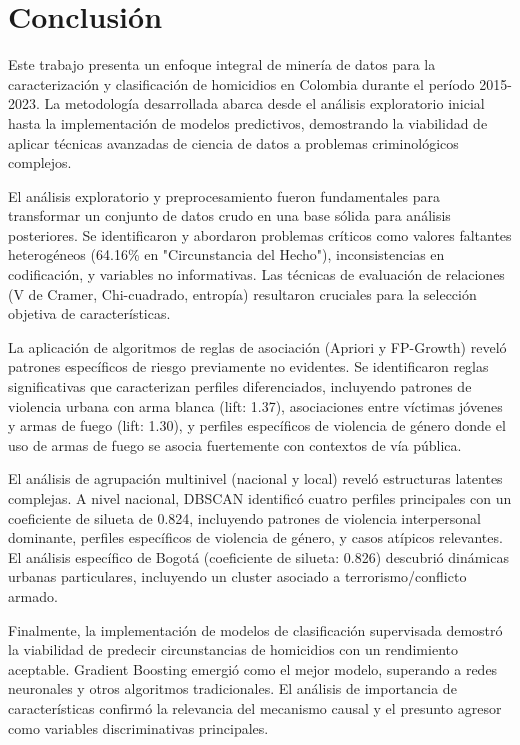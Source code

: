 \documentclass[lettersize,journal]{IEEEtran}
\begin{document}
\section{Conclusión}

Este trabajo presenta un enfoque integral de minería de datos para la caracterización y clasificación de homicidios en Colombia durante el período 2015-2023. La metodología desarrollada abarca desde el análisis exploratorio inicial hasta la implementación de modelos predictivos, demostrando la viabilidad de aplicar técnicas avanzadas de ciencia de datos a problemas criminológicos complejos.

El análisis exploratorio y preprocesamiento fueron fundamentales para transformar un conjunto de datos crudo en una base sólida para análisis posteriores. Se identificaron y abordaron problemas críticos como valores faltantes heterogéneos (64.16\% en "Circunstancia del Hecho"), inconsistencias en codificación, y variables no informativas. Las técnicas de evaluación de relaciones (V de Cramer, Chi-cuadrado, entropía) resultaron cruciales para la selección objetiva de características.

La aplicación de algoritmos de reglas de asociación (Apriori y FP-Growth) reveló patrones específicos de riesgo previamente no evidentes. Se identificaron reglas significativas que caracterizan perfiles diferenciados, incluyendo patrones de violencia urbana con arma blanca (lift: 1.37), asociaciones entre víctimas jóvenes y armas de fuego (lift: 1.30), y perfiles específicos de violencia de género donde el uso de armas de fuego se asocia fuertemente con contextos de vía pública.

El análisis de agrupación multinivel (nacional y local) reveló estructuras latentes complejas. A nivel nacional, DBSCAN identificó cuatro perfiles principales con un coeficiente de silueta de 0.824, incluyendo patrones de violencia interpersonal dominante, perfiles específicos de violencia de género, y casos atípicos relevantes. El análisis específico de Bogotá (coeficiente de silueta: 0.826) descubrió dinámicas urbanas particulares, incluyendo un cluster asociado a terrorismo/conflicto armado.

Finalmente, la implementación de modelos de clasificación supervisada demostró la viabilidad de predecir circunstancias de homicidios con un rendimiento aceptable. Gradient Boosting emergió como el mejor modelo, superando a redes neuronales y otros algoritmos tradicionales. El análisis de importancia de características confirmó la relevancia del mecanismo causal y el presunto agresor como variables discriminativas principales.
\end{document}
